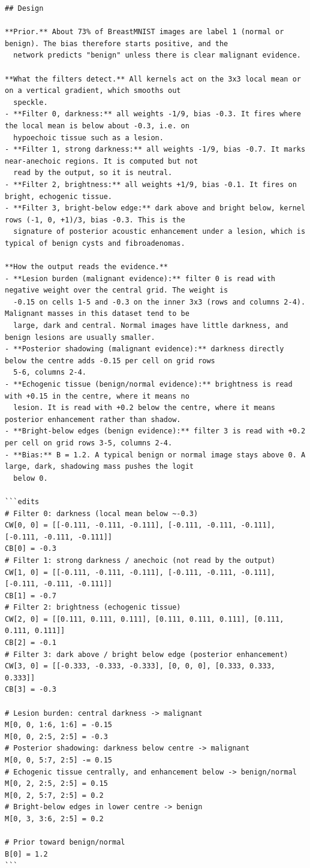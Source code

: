 \begin{verbatim}
## Design

**Prior.** About 73% of BreastMNIST images are label 1 (normal or benign). The bias therefore starts positive, and the
  network predicts "benign" unless there is clear malignant evidence.

**What the filters detect.** All kernels act on the 3x3 local mean or on a vertical gradient, which smooths out
  speckle.
- **Filter 0, darkness:** all weights -1/9, bias -0.3. It fires where the local mean is below about -0.3, i.e. on
  hypoechoic tissue such as a lesion.
- **Filter 1, strong darkness:** all weights -1/9, bias -0.7. It marks near-anechoic regions. It is computed but not
  read by the output, so it is neutral.
- **Filter 2, brightness:** all weights +1/9, bias -0.1. It fires on bright, echogenic tissue.
- **Filter 3, bright-below edge:** dark above and bright below, kernel rows (-1, 0, +1)/3, bias -0.3. This is the
  signature of posterior acoustic enhancement under a lesion, which is typical of benign cysts and fibroadenomas.

**How the output reads the evidence.**
- **Lesion burden (malignant evidence):** filter 0 is read with negative weight over the central grid. The weight is
  -0.15 on cells 1-5 and -0.3 on the inner 3x3 (rows and columns 2-4). Malignant masses in this dataset tend to be
  large, dark and central. Normal images have little darkness, and benign lesions are usually smaller.
- **Posterior shadowing (malignant evidence):** darkness directly below the centre adds -0.15 per cell on grid rows
  5-6, columns 2-4.
- **Echogenic tissue (benign/normal evidence):** brightness is read with +0.15 in the centre, where it means no
  lesion. It is read with +0.2 below the centre, where it means posterior enhancement rather than shadow.
- **Bright-below edges (benign evidence):** filter 3 is read with +0.2 per cell on grid rows 3-5, columns 2-4.
- **Bias:** B = 1.2. A typical benign or normal image stays above 0. A large, dark, shadowing mass pushes the logit
  below 0.

```edits
# Filter 0: darkness (local mean below ~-0.3)
CW[0, 0] = [[-0.111, -0.111, -0.111], [-0.111, -0.111, -0.111], [-0.111, -0.111, -0.111]]
CB[0] = -0.3
# Filter 1: strong darkness / anechoic (not read by the output)
CW[1, 0] = [[-0.111, -0.111, -0.111], [-0.111, -0.111, -0.111], [-0.111, -0.111, -0.111]]
CB[1] = -0.7
# Filter 2: brightness (echogenic tissue)
CW[2, 0] = [[0.111, 0.111, 0.111], [0.111, 0.111, 0.111], [0.111, 0.111, 0.111]]
CB[2] = -0.1
# Filter 3: dark above / bright below edge (posterior enhancement)
CW[3, 0] = [[-0.333, -0.333, -0.333], [0, 0, 0], [0.333, 0.333, 0.333]]
CB[3] = -0.3

# Lesion burden: central darkness -> malignant
M[0, 0, 1:6, 1:6] = -0.15
M[0, 0, 2:5, 2:5] = -0.3
# Posterior shadowing: darkness below centre -> malignant
M[0, 0, 5:7, 2:5] -= 0.15
# Echogenic tissue centrally, and enhancement below -> benign/normal
M[0, 2, 2:5, 2:5] = 0.15
M[0, 2, 5:7, 2:5] = 0.2
# Bright-below edges in lower centre -> benign
M[0, 3, 3:6, 2:5] = 0.2

# Prior toward benign/normal
B[0] = 1.2
```
\end{verbatim}
